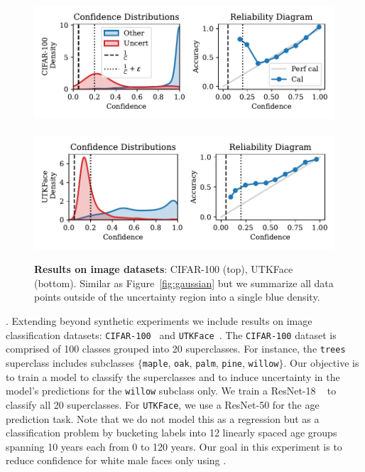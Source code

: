 \begin{figure}
    \centering
    \includegraphics[width=0.48\linewidth]{figs/confidential_guardian/cifar100_res.pdf}
    ~
    \includegraphics[width=0.48\linewidth]{figs/confidential_guardian/utkface_res.pdf}
    \caption[Results on image datasets.]{\textbf{Results on image datasets}: CIFAR-100 (top), UTKFace (bottom). Similar as Figure~\ref{fig:gaussian} but we summarize all data points outside of the uncertainty region into a single blue density.}
    \label{fig:image}
\end{figure}

. Extending beyond synthetic experiments we include results on image classification datasets: \texttt{CIFAR-100}~\citep{krizhevsky2009learning} and \texttt{UTKFace}~\citep{zhifei2017cvpr}. The \texttt{CIFAR-100} dataset is comprised of 100 classes grouped into 20 superclasses. For instance, the \texttt{trees} superclass includes subclasses $\{$\texttt{maple}, \texttt{oak}, \texttt{palm}, \texttt{pine}, \texttt{willow}$\}$. Our objective is to train a model to classify the superclasses and to induce uncertainty in the model's predictions for the \texttt{willow} subclass only. %
We train a ResNet-18 ~\citep{he2016deep} to classify all 20 superclasses. For \texttt{UTKFace}, we use a ResNet-50 for the age prediction task. Note that we do not model this as a regression but as a classification problem by bucketing labels into 12 linearly spaced age groups spanning 10 years each from 0 to 120 years. Our goal in this experiment is to reduce confidence for white male faces only using \attack.




